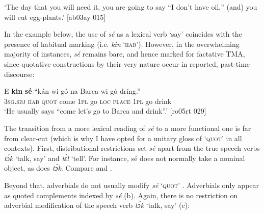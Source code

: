 \glt ‘The day that you will need it, you are going to say “I don’t have oil,” (and) 
you will cut egg-plants.’ [ab03ay 015]
\z

In the example below, the use of \textit{sé} as a lexical verb ‘say’ coincides with the presence of habitual marking (i.e. \textit{kin} ‘\textsc{hab}’). However, in the overwhelming majority of instances, \textit{sé} remains bare, and hence marked for factative TMA, since quotative constructions by their very nature occur in reported, past-time discourse: 


\ea%
    \label{ex:key:1367}
    \gll E    \textbf{kin}  \textbf{sé}    “kán    wi  gó  na  Barca  wi  gó  dríng.”\\
\textsc{3sg.sbj}  \textsc{hab}  \textsc{quot}    come  \textsc{1pl}  go  \textsc{loc}  \textsc{place}  \textsc{1pl}  go  drink\\

\glt ‘He usually says “come let’s go to Barca and drink”.’ [ro05rt 029]
\z

The transition from a more lexical reading of \textit{sé} to a more functional one is far from clear-cut (which is why I have opted for a unitary gloss of ‘\textsc{quot}’ in all contexts). First, distributional restrictions set \textit{sé} apart from the true speech verbs \textit{tɔ́k} ‘talk, say’ and \textit{tɛ́l} ‘tell’. For instance\textit{, }sé does not normally take a nominal object, as does \textit{tɔ́k}. Compare  and .


\ea%
    \label{ex:key:1368}
\z\z

Beyond that, adverbials do not usually modify \textit{sé} ‘\textsc{quot}’ . Adverbials only appear as quoted complements indexed by \textit{sé} (b). Again, there is no restriction on adverbial modification of the speech verb \textit{tɔ́k} ‘talk, say’ (c): 


\ea%
    \label{ex:key:1369}
\z\z

